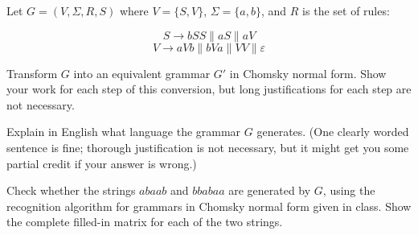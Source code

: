 \documentclass[solution, letterpaper]{cs121}
\begin{document}

Let $G = (V, \Sigma, R, S)$ where $V=\{S,V\}$, $\Sigma = \{a,b\}$, and $R$ is the set of rules: 

$$ 
S \rightarrow bSS \| aS \| aV $$
$$ V \rightarrow aVb \| bVa \| VV \| \varepsilon 
$$

\subproblem
Transform $G$ into an equivalent grammar $G'$ in Chomsky normal form. Show your work for each step of this conversion, but long justifications for each step are not necessary.

\subproblem 
Explain in English what language the grammar $G$ generates. (One clearly worded sentence is fine; thorough justification is not necessary, but it might get you some partial credit if your answer is wrong.)

\subproblem
Check whether the strings $abaab$ and $bbabaa$ are generated by $G$, using the recognition algorithm for grammars in Chomsky normal form given in class. Show the complete filled-in matrix for each of the two strings.
\end{document}
